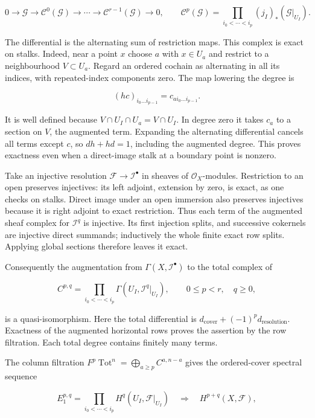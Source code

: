 \documentclass[11pt,a4paper,openany]{report}
\begin{document}
\[
0\longrightarrow\mathcal G\longrightarrow
\mathcal C^0(\mathcal G)\longrightarrow\cdots\longrightarrow
\mathcal C^{r-1}(\mathcal G)\longrightarrow0,
\qquad
\mathcal C^p(\mathcal G)=\prod_{i_0<\cdots<i_p}(j_I)_*(\mathcal G|_{U_I}).
\]

The differential is the alternating sum of restriction maps. This complex is exact on stalks. Indeed, near a point \(x\) choose \(a\) with \(x\in U_a\) and restrict to a neighbourhood \(V\subset U_a\). Regard an ordered cochain as alternating in all its indices, with repeated-index components zero. The map lowering the degree is

\[
(hc)_{i_0\ldots i_{p-1}}=c_{a i_0\ldots i_{p-1}}.
\]

It is well defined because \(V\cap U_I\cap U_a=V\cap U_I\). In degree zero it takes \(c_a\) to a section on \(V\), the augmented term. Expanding the alternating differential cancels all terms except \(c\), so \(dh+hd=1\), including the augmented degree. This proves exactness even when a direct-image stalk at a boundary point is nonzero.

Take an injective resolution \(\mathcal F\to\mathcal I^\bullet\) in sheaves of \(\mathcal O_X\)-modules. Restriction to an open preserves injectives: its left adjoint, extension by zero, is exact, as one checks on stalks. Direct image under an open immersion also preserves injectives because it is right adjoint to exact restriction. Thus each term of the augmented sheaf complex for \(\mathcal I^q\) is injective. Its first injection splits, and successive cokernels are injective direct summands; inductively the whole finite exact row splits. Applying global sections therefore leaves it exact.

Consequently the augmentation from \(\Gamma(X,\mathcal I^\bullet)\) to the total complex of

\[
C^{p,q}=\prod_{i_0<\cdots<i_p}\Gamma(U_I,\mathcal I^q|_{U_I}),
\qquad 0\leq p<r,\quad q\geq0,
\]

is a quasi-isomorphism. Here the total differential is \(d_{\mathrm{cover}}+(-1)^p d_{\mathrm{resolution}}\). Exactness of the augmented horizontal rows proves the assertion by the row filtration. Each total degree contains finitely many terms.

The column filtration \(F^p\operatorname{Tot}^n=\bigoplus_{a\geq p}C^{a,n-a}\) gives the ordered-cover spectral sequence

\[
E_1^{p,q}=\prod_{i_0<\cdots<i_p}H^q(U_I,\mathcal F|_{U_I})
\quad\Longrightarrow\quad H^{p+q}(X,\mathcal F),
\]
\end{document}
